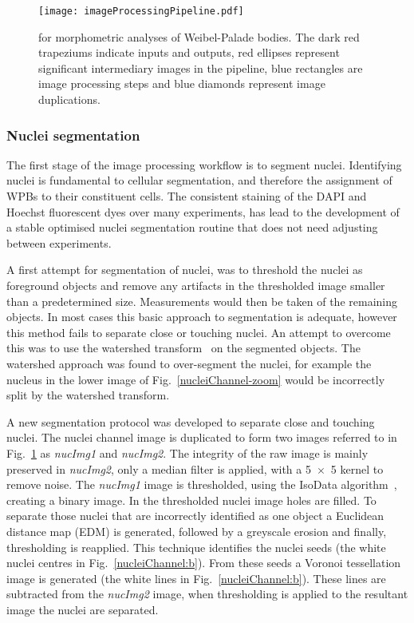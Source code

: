 \begin{figure}
	\centering
	\texttt{[image: imageProcessingPipeline.pdf]}
	\caption[Image processing pipeline WPB]{for morphometric analyses of Weibel-Palade bodies. The dark red trapeziums indicate inputs and outputs, red ellipses represent significant intermediary images in the pipeline, blue rectangles are image processing steps and blue diamonds represent image duplications.}
	\label{imageProcessingPipeline:WPB}
\end{figure}

\subsubsection{Nuclei segmentation}
The first stage of the image processing workflow is to segment nuclei. Identifying nuclei is fundamental to cellular segmentation, and therefore the assignment of WPBs to their constituent cells. The consistent staining of the DAPI and Hoechst fluorescent dyes over many experiments, has lead to the development of a stable optimised nuclei segmentation routine that does not need adjusting between experiments.

A first attempt for segmentation of nuclei, was to threshold the nuclei as foreground objects and remove any artifacts in the thresholded image smaller than a predetermined size. Measurements would then be taken of the remaining objects. In most cases this basic approach to segmentation is adequate, however this method fails to separate close or touching nuclei. An attempt to overcome this was to use the watershed transform~\cite{Vincent1991} on the segmented objects. The watershed approach was found to over-segment the nuclei, for example the nucleus in the lower image of Fig.~\ref{nucleiChannel-zoom} would be incorrectly split by the watershed transform.

A new segmentation protocol was developed to separate close and touching nuclei. The nuclei channel image is duplicated to form two images referred to in Fig.~\ref{imageProcessingPipeline:WPB} as \emph{nucImg1} and \emph{nucImg2}. The integrity of the raw image is mainly preserved in \emph{nucImg2}, only a median filter is applied, with a 5~$\times$~5 kernel to remove noise. The \emph{nucImg1} image is thresholded, using the IsoData algorithm~\cite{Ridler1978}, creating a binary image. In the thresholded nuclei image holes are filled. To separate those nuclei that are incorrectly identified as one object a Euclidean distance map (EDM) is generated, followed by a greyscale erosion and finally, thresholding is reapplied. This technique identifies the nuclei seeds (the white nuclei centres in Fig.~\ref{nucleiChannel:b}). From these seeds a Voronoi tessellation image is generated (the white lines in Fig.~\ref{nucleiChannel:b}). These lines are subtracted from the \emph{nucImg2} image, when thresholding is applied to the resultant image the nuclei are separated. 
 
